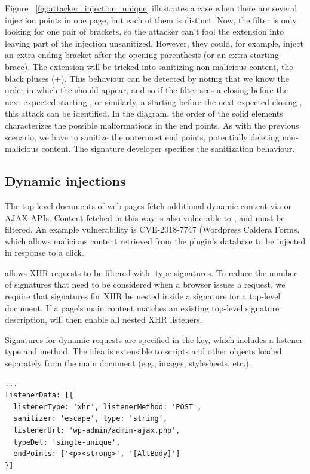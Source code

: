 Figure ~\ref{fig:attacker_injection_unique} illustrates a case when
there are several injection points in one page, but each of them is
distinct. Now, the filter is only looking for one pair of brackets, so
the attacker can't fool the extension into leaving part of the
injection unsanitized. However, they could, for example, inject an
extra ending bracket after the opening parenthesis (or an extra
starting brace). The extension will be tricked into sanitizing
non-malicious content, the black pluses (+). This behaviour can be
detected by noting that we know the order in which the
 should appear, and so if the filter sees a closing
 before the next expected starting , or
similarly, a starting  before the next expected closing
, this attack can be identified. In the diagram, the
order of the solid elements characterizes the possible malformations
in the end points. As with the previous scenario, we have to sanitize
the outermost end points, potentially deleting non-malicious
content. The signature developer specifies the sanitization behaviour.

\subsection{Dynamic injections} \label{dynamic_injections}

The top-level documents of web pages fetch additional dynamic content
via  or AJAX APIs. Content fetched in
this way is also vulnerable to \xss, and must be filtered. An example
vulnerability is CVE-2018-7747 (Wordpress Caldera Forms, which allows malicious
content retrieved from the plugin's database to be injected in response to a click.

\sys allows XHR requests to be filtered with -type
signatures. To reduce the number of signatures that need to be
considered when a browser issues a request, we require that signatures
for XHR be nested inside a signature for a top-level document. If a
page's main content matches an existing top-level signature description,
\sys will then enable all nested XHR listeners.

Signatures for dynamic requests are specified in the 
key, which includes a listener type and method. The idea is extensible
to scripts and other objects loaded separately from the main document
(e.g., images, stylesheets, etc.).

\begin{lstlisting}[breaklines=true,caption={
      An example dynamic request signature. This patches CVE-2018-7747.
    },label={lst:dynamic_signature}]
...
listenerData: [{
  listenerType: 'xhr', listenerMethod: 'POST',
  sanitizer: 'escape', type: 'string',
  listenerUrl: 'wp-admin/admin-ajax.php',
  typeDet: 'single-unique',
  endPoints: ['<p><strong>', '[AltBody]']
}]
\end{lstlisting}

